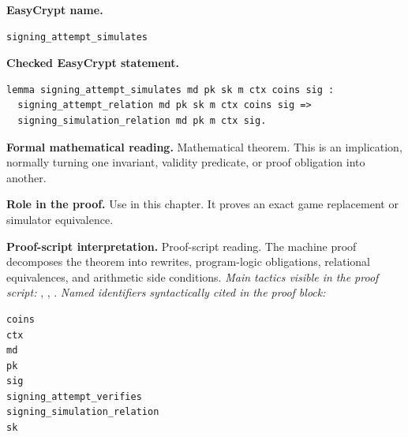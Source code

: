 \begin{formaltheorem}
\noindent\textbf{EasyCrypt name.}
\begin{lstlisting}[language=EasyCrypt,basicstyle=\ttfamily\scriptsize]
signing_attempt_simulates
\end{lstlisting}
\noindent\textbf{Checked EasyCrypt statement.}
\begin{lstlisting}[language=EasyCrypt,basicstyle=\ttfamily\scriptsize]
lemma signing_attempt_simulates md pk sk m ctx coins sig :
  signing_attempt_relation md pk sk m ctx coins sig =>
  signing_simulation_relation md pk m ctx sig.
\end{lstlisting}
\noindent\textbf{Formal mathematical reading.}
Mathematical theorem. This is an implication, normally turning one invariant, validity predicate, or proof obligation into another.

\noindent\textbf{Role in the proof.}
Use in this chapter. It proves an exact game replacement or simulator equivalence.

\noindent\textbf{Proof-script interpretation.}
Proof-script reading. The machine proof decomposes the theorem into rewrites, program-logic obligations, relational equivalences, and arithmetic side conditions.
\emph{Main tactics visible in the proof script:} , , .
\emph{Named identifiers syntactically cited in the proof block:}
\begin{lstlisting}[language=EasyCrypt,basicstyle=\ttfamily\scriptsize]
coins
ctx
md
pk
sig
signing_attempt_verifies
signing_simulation_relation
sk
\end{lstlisting}

\end{formaltheorem}

